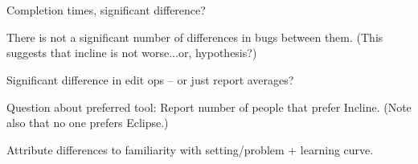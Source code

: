 \section{\RQB}

Completion times, significant difference?

There is not a significant number of differences in bugs between them. (This suggests that incline is not worse...or, hypothesis?)

Significant difference in edit ops -- or just report averages?

Question about preferred tool: Report number of people that prefer Incline. (Note also that no one prefers Eclipse.)

Attribute differences to familiarity with setting/problem + learning curve.

\section{\RQC}

